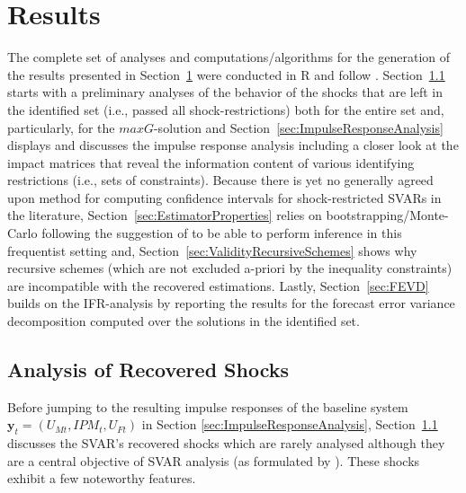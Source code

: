 \documentclass[a4paper,11pt,listof=nochaptergap,oneside,pointednumbers,bibtotoc,bigheadings,liststotoc,hidelinks]{scrbook}
\theoremstyle{mysatz}
\theoremstyle{mydefinition}
\theoremstyle{mytheorem}
\theoremstyle{mybemerkung}
\newcommand{\vect}[1]{\boldsymbol{\mathbf{#1}}}
\begin{document}
\chapter{Results}
\label{Results}

The complete set of analyses and computations/algorithms for the generation of the results presented in Section~\ref{Results} were conducted in R and follow \citet{ludvigsonetal:18}. Section~\ref{sec:uncertaintyShocks} starts with a preliminary analyses of the behavior of the shocks that are left in the identified set (i.e., passed all shock-restrictions) both for the entire set and, particularly, for the $maxG$-solution and Section~\ref{sec:ImpulseResponseAnalysis} displays and discusses the impulse response analysis including a closer look at the impact matrices that reveal the information content of various identifying restrictions (i.e., sets of constraints). Because there is yet no generally agreed upon method for computing confidence intervals for shock-restricted SVARs in the literature, Section~\ref{sec:EstimatorProperties} relies on bootstrapping/Monte-Carlo following the suggestion of \citet{ludvigsonetal:19} to be able to perform inference in this frequentist setting and, Section~\ref{sec:ValidityRecursiveSchemes} shows why recursive schemes (which are not excluded a-priori by the inequality constraints) are incompatible with the recovered estimations. Lastly, Section~\ref{sec:FEVD} builds on the IFR-analysis by reporting the results for the forecast error variance decomposition computed over the solutions in the identified set.


\section{Analysis of Recovered Shocks}
\label{sec:uncertaintyShocks}

Before jumping to the resulting impulse responses of the baseline system $\vect{y}_t = (U_{Mt}, IPM_{t}, U_{Ft})$ in Section \ref{sec:ImpulseResponseAnalysis}, Section~\ref{sec:uncertaintyShocks} discusses the SVAR's recovered shocks which are rarely analysed although they are a central objective of SVAR analysis (as formulated by \citealp{ludvigsonetal:17}). These shocks exhibit a few noteworthy features.\\
\end{document}
